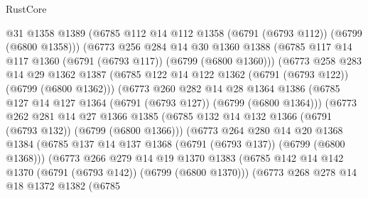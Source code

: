 \begin{lexlean}{RustCore}
\begin{coremodule}
                    @31
                    @1358
                    @1389
                    (@6785 @112 @14 @112 @1358 (@6791 (@6793 @112)) (@6799 (@6800 @1358)))
                    (@6773
                      @256
                      @284
                      @14
                      @30
                      @1360
                      @1388
                      (@6785 @117 @14 @117 @1360 (@6791 (@6793 @117)) (@6799 (@6800 @1360)))
                      (@6773
                        @258
                        @283
                        @14
                        @29
                        @1362
                        @1387
                        (@6785 @122 @14 @122 @1362 (@6791 (@6793 @122)) (@6799 (@6800 @1362)))
                        (@6773
                          @260
                          @282
                          @14
                          @28
                          @1364
                          @1386
                          (@6785 @127 @14 @127 @1364 (@6791 (@6793 @127)) (@6799 (@6800 @1364)))
                          (@6773
                            @262
                            @281
                            @14
                            @27
                            @1366
                            @1385
                            (@6785 @132 @14 @132 @1366 (@6791 (@6793 @132)) (@6799 (@6800 @1366)))
                            (@6773
                              @264
                              @280
                              @14
                              @20
                              @1368
                              @1384
                              (@6785 @137 @14 @137 @1368 (@6791 (@6793 @137)) (@6799 (@6800 @1368)))
                              (@6773
                                @266
                                @279
                                @14
                                @19
                                @1370
                                @1383
                                (@6785
                                  @142
                                  @14
                                  @142
                                  @1370
                                  (@6791 (@6793 @142))
                                  (@6799 (@6800 @1370)))
                                (@6773
                                  @268
                                  @278
                                  @14
                                  @18
                                  @1372
                                  @1382
                                  (@6785

\end{coremodule}
\end{lexlean}
